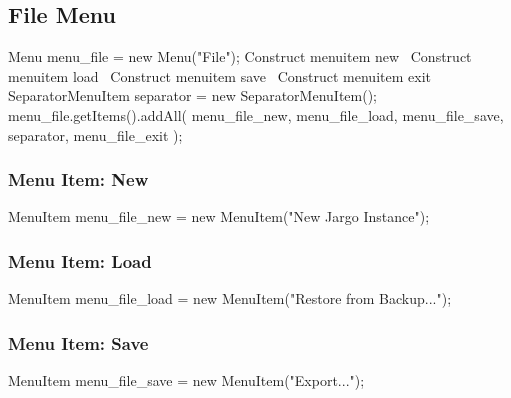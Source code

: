 \documentclass{article}
\def\nwendcode{\endtrivlist \endgroup}      %
\let\nwdocspar=\par
\begin{document}
\subsection{File Menu}
\nwenddocs{}\endmoddef{}
Menu menu_file = new Menu("File");
\LA{}Construct menuitem new~{\nwtagstyle{}}\RA{}
\LA{}Construct menuitem load~{\nwtagstyle{}}\RA{}
\LA{}Construct menuitem save~{\nwtagstyle{}}\RA{}
\LA{}Construct menuitem exit~{\nwtagstyle{}}\RA{}
SeparatorMenuItem separator = new SeparatorMenuItem();
menu_file.getItems().addAll(
    menu_file_new,
    menu_file_load,
    menu_file_save,
    separator,
    menu_file_exit
);
\nwendcode{}\nwdocspar

\subsubsection{Menu Item: New}
\nwenddocs{}\endmoddef{}
MenuItem menu_file_new = new MenuItem("New Jargo Instance");
\nwendcode{}\nwdocspar

\subsubsection{Menu Item: Load}
\nwenddocs{}\endmoddef{}
MenuItem menu_file_load = new MenuItem("Restore from Backup...");
\nwendcode{}\nwdocspar

\subsubsection{Menu Item: Save}
\nwenddocs{}\endmoddef{}
MenuItem menu_file_save = new MenuItem("Export...");
\nwendcode{}\nwdocspar
\end{document}
